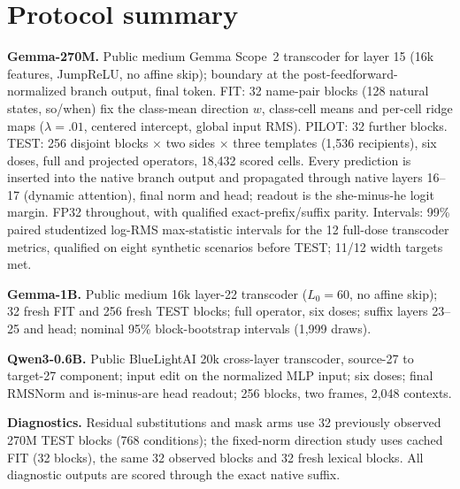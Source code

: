 \documentclass[11pt]{article}
\begin{document}
\clearpage
{\small

}
\appendix
\section{Protocol summary}\label{app:protocol}
\textbf{Gemma-270M.} Public medium Gemma Scope~2 transcoder for layer 15 (16k features, JumpReLU, no affine skip); boundary at the post-feedforward-normalized branch output, final token. FIT: 32 name-pair blocks (128 natural states, so/when) fix the class-mean direction $w$, class-cell means and per-cell ridge maps ($\lambda=.01$, centered intercept, global input RMS). PILOT: 32 further blocks. TEST: 256 disjoint blocks $\times$ two sides $\times$ three templates (1,536 recipients), six doses, full and projected operators, 18,432 scored cells. Every prediction is inserted into the native branch output and propagated through native layers 16--17 (dynamic attention), final norm and head; readout is the she-minus-he logit margin. FP32 throughout, with qualified exact-prefix/suffix parity. Intervals: 99\% paired studentized log-RMS max-statistic intervals for the 12 full-dose transcoder metrics, qualified on eight synthetic scenarios before TEST; 11/12 width targets met.

\textbf{Gemma-1B.} Public medium 16k layer-22 transcoder ($L_0=60$, no affine skip); 32 fresh FIT and 256 fresh TEST blocks; full operator, six doses; suffix layers 23--25 and head; nominal 95\% block-bootstrap intervals (1,999 draws).

\textbf{Qwen3-0.6B.} Public BlueLightAI 20k cross-layer transcoder, source-27 to target-27 component; input edit on the normalized MLP input; six doses; final RMSNorm and is-minus-are head readout; 256 blocks, two frames, 2,048 contexts.

\textbf{Diagnostics.} Residual substitutions and mask arms use 32 previously observed 270M TEST blocks (768 conditions); the fixed-norm direction study uses cached FIT (32 blocks), the same 32 observed blocks and 32 fresh lexical blocks. All diagnostic outputs are scored through the exact native suffix.



\end{document}
